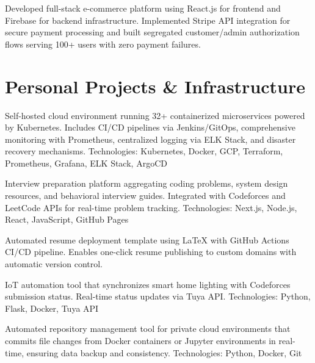 \documentclass[]{hanisntsolo-resume}
\begin{document}
\sectionsep


\begin{tightemize}
\item Developed full-stack e-commerce platform using React.js for frontend and Firebase for backend infrastructure. Implemented Stripe API integration for secure payment processing and built segregated customer/admin authorization flows serving 100+ users with zero payment failures.
\end{tightemize}

\sectionsep


\section{Personal Projects \& Infrastructure}

Self-hosted cloud environment running 32+ containerized microservices powered by Kubernetes. Includes CI/CD pipelines via Jenkins/GitOps, comprehensive monitoring with Prometheus, centralized logging via ELK Stack, and disaster recovery mechanisms.
Technologies: Kubernetes, Docker, GCP, Terraform, Prometheus, Grafana, ELK Stack, ArgoCD

Interview preparation platform aggregating coding problems, system design resources, and behavioral interview guides. Integrated with Codeforces and LeetCode APIs for real-time problem tracking.
Technologies: Next.js, Node.js, React, JavaScript, GitHub Pages

Automated resume deployment template using LaTeX with GitHub Actions CI/CD pipeline. Enables one-click resume publishing to custom domains with automatic version control.

IoT automation tool that synchronizes smart home lighting with Codeforces submission status. Real-time status updates via Tuya API.
Technologies: Python, Flask, Docker, Tuya API

Automated repository management tool for private cloud environments that commits file changes from Docker containers or Jupyter environments in real-time, ensuring data backup and consistency.
Technologies: Python, Docker, Git
\end{document}
